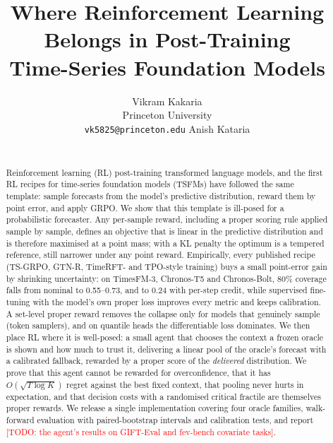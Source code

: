 \documentclass{article}
\title{Where Reinforcement Learning Belongs in Post-Training\\Time-Series Foundation Models}
\author{Vikram Kakaria \\
Princeton University \\
\texttt{vk5825@princeton.edu}
\And
Anish Kataria \\
\todo{affiliation} \\
\texttt{\todo{email}}
}
\newcommand{\todo}[1]{\textcolor{red}{[TODO: #1]}}
\begin{document}
\maketitle

\begin{abstract}
Reinforcement learning (RL) post-training transformed language models, and the first RL recipes for time-series foundation models (TSFMs) have followed the same template: sample forecasts from the model's predictive distribution, reward them by point error, and apply GRPO. We show that this template is ill-posed for a probabilistic forecaster. Any per-sample reward, including a proper scoring rule applied sample by sample, defines an objective that is linear in the predictive distribution and is therefore maximised at a point mass; with a KL penalty the optimum is a tempered reference, still narrower under any point reward. Empirically, every published recipe (TS-GRPO, GTN-R, TimeRFT- and TPO-style training) buys a small point-error gain by shrinking uncertainty: on TimesFM-3, Chronos-T5 and Chronos-Bolt, 80\% coverage falls from nominal to 0.55--0.73, and to 0.24 with per-step credit, while supervised fine-tuning with the model's own proper loss improves every metric and keeps calibration. A set-level proper reward removes the collapse only for models that genuinely sample (token samplers), and on quantile heads the differentiable loss dominates. We then place RL where it is well-posed: a small agent that chooses the context a frozen oracle is shown and how much to trust it, delivering a linear pool of the oracle's forecast with a calibrated fallback, rewarded by a proper score of the \emph{delivered} distribution. We prove that this agent cannot be rewarded for overconfidence, that it has $O(\sqrt{T\log K})$ regret against the best fixed context, that pooling never hurts in expectation, and that decision costs with a randomised critical fractile are themselves proper rewards. We release a single implementation covering four oracle families, walk-forward evaluation with paired-bootstrap intervals and calibration tests, and report \todo{the agent's results on GIFT-Eval and fev-bench covariate tasks}.
\end{abstract}
\end{document}
